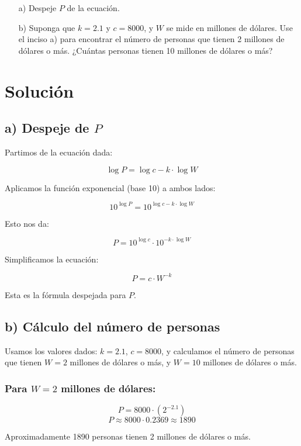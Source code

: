 \documentclass{article}
\begin{document}
\begin{enumerate}
    \item[a)] Despeje \(P\) de la ecuación.
    \item[b)] Suponga que \(k = 2.1\) y \(c = 8000\), y \(W\) se mide en millones de dólares. Use el inciso a) para encontrar el número de personas que tienen 2 millones de dólares o más. ¿Cuántas personas tienen 10 millones de dólares o más?
\end{enumerate}

\section*{Solución}

\subsection*{a) Despeje de \(P\)}

Partimos de la ecuación dada:

\[
\log P = \log c - k \cdot \log W
\]

Aplicamos la función exponencial (base 10) a ambos lados:

\[
10^{\log P} = 10^{\log c - k \cdot \log W}
\]

Esto nos da:

\[
P = 10^{\log c} \cdot 10^{-k \cdot \log W}
\]

Simplificamos la ecuación:

\[
P = c \cdot W^{-k}
\]

Esta es la fórmula despejada para \(P\).

\subsection*{b) Cálculo del número de personas}

Usamos los valores dados: \(k = 2.1\), \(c = 8000\), y calculamos el número de personas que tienen \(W = 2\) millones de dólares o más, y \(W = 10\) millones de dólares o más.

\subsubsection*{Para \(W = 2\) millones de dólares:}

\[
P = 8000 \cdot (2^{-2.1})
\]
\[
P \approx 8000 \cdot 0.2369 \approx 1890
\]

Aproximadamente 1890 personas tienen 2 millones de dólares o más.
\end{document}
